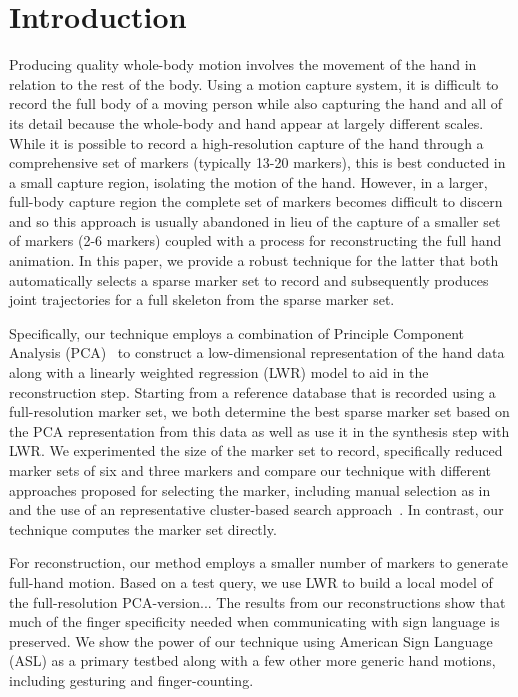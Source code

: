 

\section{Introduction}
Producing quality whole-body motion involves the movement of the hand in relation to the rest of the body. Using a motion capture system, it is difficult to record the full body of a moving person while also capturing the hand and all of its detail because the whole-body and hand appear at largely different scales.  While it is possible to record a high-resolution capture of the hand through a comprehensive set of markers (typically 13-20 markers), this is best conducted in a small capture region, isolating the motion of the hand.  However, in a larger, full-body capture region the complete set of markers becomes difficult to discern and so this approach is usually abandoned in lieu of the capture of a smaller set of markers (2-6 markers) coupled with a process for reconstructing the full hand animation.  In this paper, we provide a robust technique for the latter that both automatically selects a sparse marker set to record and subsequently produces joint trajectories for a full skeleton from the sparse marker set.  

Specifically, our technique employs a combination of Principle Component Analysis (PCA)~\cite{blahPCA} to construct a low-dimensional representation of the hand data along with a linearly weighted regression (LWR) model to aid in the reconstruction step.  Starting from a reference database that is recorded using a full-resolution marker set, we both determine the best sparse marker set based on the PCA representation from this data as well as use it in the synthesis step with LWR.  We experimented the size of the marker set to record, specifically reduced marker sets of six and three markers and compare our technique with different approaches proposed for selecting the marker, including manual selection as in ~\cite{HoyRyaOSu11} and the use of an representative cluster-based search approach~\cite{KanWheZor12}. In contrast, our technique computes the marker set directly.

For reconstruction, our method employs a smaller number of markers to generate full-hand motion. Based on a test query, we use LWR to build a local model of the full-resolution PCA-version... The results from our reconstructions show that much of the finger specificity needed when communicating with sign language is preserved. We show the power of our technique using American Sign Language (ASL) as a primary testbed along with a few other more generic hand motions, including gesturing and finger-counting.